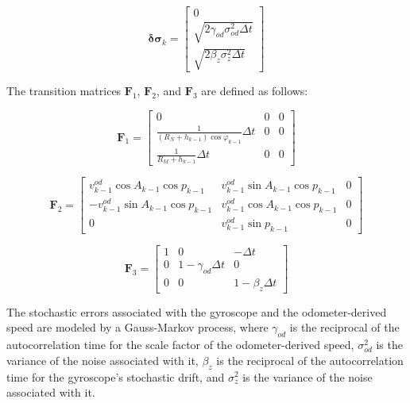 \documentclass[conference]{IEEEtran}
\begin{document}
\begin{equation}
    \boldsymbol{\delta \sigma}_k =
    \begin{bmatrix} 
        0 \\ 
        \sqrt{2 \gamma_{od} \sigma_{od}^2 \Delta t} \\ 
        \sqrt{2 \beta_z \sigma_z^2 \Delta t} 
    \end{bmatrix}
\end{equation}

The transition matrices $\mathbf{F}_1$, $\mathbf{F}_2$, and $\mathbf{F}_3$ are defined as follows:

\begin{equation}
    \mathbf{F}_1 =
    \begin{bmatrix} 
        0 & 0 & 0 \\ 
        \frac{1}{(R_N+h_{k-1}) \cos{\varphi_{k-1}}} \Delta t & 0 & 0 \\ 
        \frac{1}{R_M+h_{k-1}} \Delta t & 0 & 0 
    \end{bmatrix}
\end{equation}

\begin{equation}
    \mathbf{F}_2 =
    \begin{bmatrix} 
        v_{k-1}^{od} \cos A_{k-1} \cos p_{k-1} & v_{k-1}^{od} \sin A_{k-1} \cos p_{k-1} & 0 \\ 
        -v_{k-1}^{od} \sin A_{k-1} \cos p_{k-1} & v_{k-1}^{od} \cos A_{k-1} \cos p_{k-1} & 0 \\ 
        0 & v_{k-1}^{od} \sin p_{k-1} & 0 
    \end{bmatrix}
\end{equation}

\begin{equation}
    \mathbf{F}_3 =
    \begin{bmatrix} 
        1 & 0 & -\Delta t \\ 
        0 & 1 - \gamma_{od} \Delta t & 0 \\ 
        0 & 0 & 1 - \beta_z \Delta t 
    \end{bmatrix}
\end{equation}

The stochastic errors associated with the gyroscope and the odometer-derived speed are modeled by a Gauss-Markov process, where $\gamma_{od}$ is the reciprocal of the autocorrelation time for the scale factor of the odometer-derived speed, $\sigma_{od}^2$ is the variance of the noise associated with it, $\beta_z$ is the reciprocal of the autocorrelation time for the gyroscope's stochastic drift, and $\sigma_z^2$ is the variance of the noise associated with it.
\end{document}
